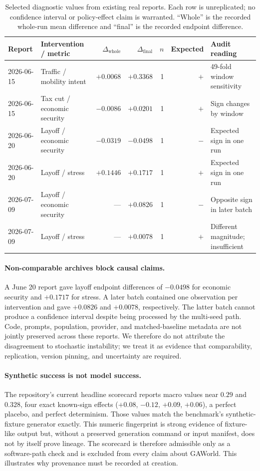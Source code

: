 \documentclass[letterpaper]{article}
\begin{document}
\begin{table}[t]
\centering
\caption{Selected diagnostic values from existing real reports. Each row is unreplicated; no confidence
interval or policy-effect claim is warranted. ``Whole'' is the recorded whole-run mean difference and
``final'' is the recorded endpoint difference.}
\label{tab:effects}
\begin{tabular}{llrrrrl}
\toprule
Report & Intervention / metric & $\Delta_{\mathrm{whole}}$ & $\Delta_{\mathrm{final}}$ & $n$ & Expected & Audit reading \\
\midrule
2026-06-15 & Traffic / mobility intent & $+0.0068$ & $+0.3368$ & 1 & $+$ & 49-fold window sensitivity \\
2026-06-15 & Tax cut / economic security & $-0.0086$ & $+0.0201$ & 1 & $+$ & Sign changes by window \\
2026-06-20 & Layoff / economic security & $-0.0319$ & $-0.0498$ & 1 & $-$ & Expected sign in one run \\
2026-06-20 & Layoff / stress & $+0.1446$ & $+0.1717$ & 1 & $+$ & Expected sign in one run \\
2026-07-09 & Layoff / economic security & --- & $+0.0826$ & 1 & $-$ & Opposite sign in later batch \\
2026-07-09 & Layoff / stress & --- & $+0.0078$ & 1 & $+$ & Different magnitude; insufficient \\
\bottomrule
\end{tabular}
\end{table}

\paragraph{Non-comparable archives block causal claims.}
A June 20 report gave layoff endpoint differences of $-0.0498$ for economic security and $+0.1717$ for
stress. A later batch contained one observation per intervention and gave $+0.0826$ and $+0.0078$,
respectively. The latter batch cannot produce a confidence interval despite being processed by the
multi-seed path. Code, prompts, population, provider, and matched-baseline metadata are not jointly
preserved across these reports. We therefore do not attribute the disagreement to stochastic instability;
we treat it as evidence that comparability, replication, version pinning, and uncertainty are required.

\paragraph{Synthetic success is not model success.}
The repository's current headline scorecard reports macro values near $0.29$ and $0.328$, four exact
known-sign effects ($+0.08$, $-0.12$, $+0.09$, $+0.06$), a perfect placebo, and perfect determinism.
Those values match the benchmark's synthetic-fixture generator exactly. This numeric fingerprint is
strong evidence of fixture-like output but, without a preserved generation command or input manifest,
does not by itself prove lineage. The scorecard is therefore admissible only as a software-path check and
is excluded from every claim about GAWorld. This illustrates why provenance must be recorded at creation.
\end{document}
